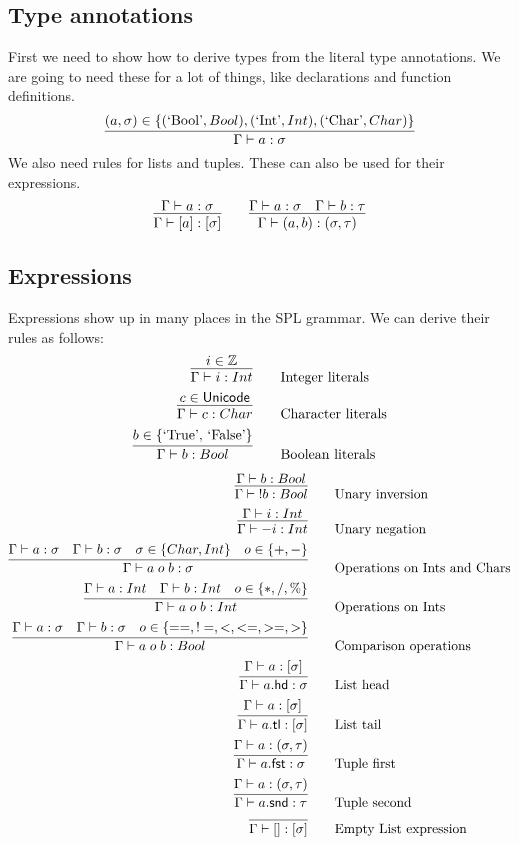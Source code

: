 \subsection{Type annotations}
First we need to show how to derive types from the literal type annotations.
We are going to need these for a lot of things, like declarations and function definitions.
\[
\infer{\Gamma \vdash a : \sigma}{(a, \sigma) \in \{(\mbox{`Bool'}, Bool), (\mbox{`Int'}, Int), (\mbox{`Char'}, Char)\} }
\]
We also need rules for lists and tuples.
These can also be used for their expressions.
\[
\infer{\Gamma \vdash [a] : [\sigma]}{\Gamma \vdash a : \sigma}\qquad
\infer{\Gamma \vdash (a, b) : (\sigma, \tau)}{\Gamma \vdash a : \sigma & \Gamma \vdash b : \tau}
\]

\subsection{Expressions}
Expressions show up in many places in the SPL grammar.
We can derive their rules as follows:
\begin{align*}
    \infer{\Gamma \vdash i : Int}{i \in \mathbb{Z}} &\qquad \mbox{Integer literals} \\
    \infer{\Gamma \vdash c : Char}{c \in \mathsf{Unicode}} &\qquad \mbox{Character literals} \\
    \infer{\Gamma \vdash b : Bool}{b \in \{\mbox{`True', `False'}\}} &\qquad \mbox{Boolean literals} \\
\end{align*}
\begin{align*}
    \infer{\Gamma \vdash\; !b : Bool}{\Gamma \vdash b : Bool} &\qquad \mbox{Unary inversion}\\
    \infer{\Gamma \vdash -i : Int}{\Gamma \vdash i : Int} &\qquad \mbox{Unary negation}\\
    \infer{\Gamma \vdash a\; o\; b : \sigma}{\Gamma \vdash a : \sigma & \Gamma \vdash b : \sigma & \sigma \in \{Char, Int\} & o \in \{+, -\}} &\qquad \mbox{Operations on Ints and Chars}\\
    \infer{\Gamma \vdash a\; o\; b : Int}{\Gamma \vdash a : Int & \Gamma \vdash b : Int & o \in \{*, /, \% \}} &\qquad \mbox{Operations on Ints}\\
    \infer{\Gamma \vdash a\; o\; b : Bool}{\Gamma \vdash a : \sigma & \Gamma \vdash b : \sigma & o \in \{==, !=, <, <=, >=, >\}} &\qquad \mbox{Comparison operations}\\
    \infer{\Gamma \vdash a\mathsf{.hd} : \sigma}{\Gamma \vdash a : [\sigma]} &\qquad \mbox{List head}\\
    \infer{\Gamma \vdash a\mathsf{.tl} : [\sigma]}{\Gamma \vdash a : [\sigma]} &\qquad \mbox{List tail}\\
    \infer{\Gamma \vdash a\mathsf{.fst} : \sigma}{\Gamma \vdash a : (\sigma, \tau)} &\qquad \mbox{Tuple first}\\
    \infer{\Gamma \vdash a\mathsf{.snd} : \tau}{\Gamma \vdash a : (\sigma, \tau)} &\qquad \mbox{Tuple second} \\
    \infer{\Gamma \vdash [] : [\sigma]}{} &\qquad \mbox{Empty List expression}
\end{align*}


